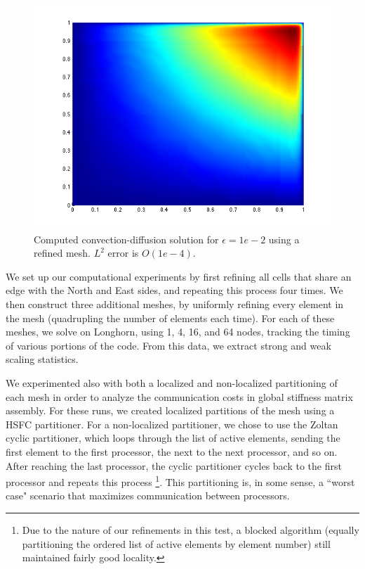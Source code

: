 \documentclass{article}
\newcommand{\oneFig}{.5}
\begin{document}
\begin{figure}
\centering
\includegraphics[scale=\oneFig]{figs/Solution3232nomesh.png}
\caption{Computed convection-diffusion solution for $\epsilon=1e-2$ using a refined mesh.  $L^2$ error is $O(1e-4)$.}
\end{figure}

We set up our computational experiments by first refining all cells that share an edge with the North and East sides, and repeating this process four times.   We then construct three additional meshes, by uniformly refining every element in the mesh (quadrupling the number of elements each time).  For each of these meshes, we solve on Longhorn, using 1, 4, 16, and 64 nodes, tracking the timing of various portions of the code.  From this data, we extract strong and weak scaling statistics.  

We experimented also with both a localized and non-localized partitioning of each mesh in order to analyze the communication costs in global stiffness matrix assembly.  For these runs, we created localized partitions of the mesh using a HSFC partitioner.  For a non-localized partitioner, we chose to use the Zoltan cyclic partitioner, which loops through the list of active elements, sending the first element to the first processor, the next to the next processor, and so on.  After reaching the last processor, the cyclic partitioner cycles back to the first processor and repeats this process \footnote{Due to the nature of our refinements in this test, a blocked algorithm (equally partitioning the ordered list of active elements by element number) still maintained fairly good locality.}.  This partitioning is, in some sense, a ``worst case" scenario that maximizes communication between processors.  
\end{document}
